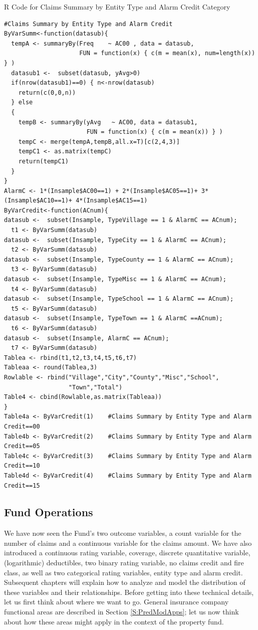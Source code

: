\documentclass[]{book}
\theoremstyle{definition}
\theoremstyle{definition}
\theoremstyle{definition}
\theoremstyle{remark}
\begin{document}
R Code for Claims Summary by Entity Type and Alarm Credit Category

\hypertarget{display.RateAlarmCredit.2}{}
\begin{verbatim}
#Claims Summary by Entity Type and Alarm Credit
ByVarSumm<-function(datasub){
  tempA <- summaryBy(Freq    ~ AC00 , data = datasub,   
                     FUN = function(x) { c(m = mean(x), num=length(x)) } )
  datasub1 <-  subset(datasub, yAvg>0)
  if(nrow(datasub1)==0) { n<-nrow(datasub)
    return(c(0,0,n))
  } else 
  {
    tempB <- summaryBy(yAvg   ~ AC00, data = datasub1,
                       FUN = function(x) { c(m = mean(x)) } )
    tempC <- merge(tempA,tempB,all.x=T)[c(2,4,3)]
    tempC1 <- as.matrix(tempC)
    return(tempC1)
  }
}
AlarmC <- 1*(Insample$AC00==1) + 2*(Insample$AC05==1)+ 3*(Insample$AC10==1)+ 4*(Insample$AC15==1)
ByVarCredit<-function(ACnum){
datasub <-  subset(Insample, TypeVillage == 1 & AlarmC == ACnum); 
  t1 <- ByVarSumm(datasub)
datasub <-  subset(Insample, TypeCity == 1 & AlarmC == ACnum);      
  t2 <- ByVarSumm(datasub)
datasub <-  subset(Insample, TypeCounty == 1 & AlarmC == ACnum);   
  t3 <- ByVarSumm(datasub)
datasub <-  subset(Insample, TypeMisc == 1 & AlarmC == ACnum);
  t4 <- ByVarSumm(datasub)
datasub <-  subset(Insample, TypeSchool == 1 & AlarmC == ACnum);    
  t5 <- ByVarSumm(datasub)
datasub <-  subset(Insample, TypeTown == 1 & AlarmC ==ACnum);      
  t6 <- ByVarSumm(datasub)
datasub <-  subset(Insample, AlarmC == ACnum);  
  t7 <- ByVarSumm(datasub)
Tablea <- rbind(t1,t2,t3,t4,t5,t6,t7)
Tableaa <- round(Tablea,3)
Rowlable <- rbind("Village","City","County","Misc","School",
                  "Town","Total")
Table4 <- cbind(Rowlable,as.matrix(Tableaa))
}
Table4a <- ByVarCredit(1)    #Claims Summary by Entity Type and Alarm Credit==00
Table4b <- ByVarCredit(2)    #Claims Summary by Entity Type and Alarm Credit==05 
Table4c <- ByVarCredit(3)    #Claims Summary by Entity Type and Alarm Credit==10
Table4d <- ByVarCredit(4)    #Claims Summary by Entity Type and Alarm Credit==15
\end{verbatim}

\subsection{Fund Operations}\label{fund-operations}

We have now seen the Fund's two outcome variables, a count variable for
the number of claims and a continuous variable for the claims amount. We
have also introduced a continuous rating variable, coverage, discrete
quantitative variable, (logarithmic) deductibles, two binary rating
variable, no claims credit and fire class, as well as two categorical
rating variables, entity type and alarm credit. Subsequent chapters will
explain how to analyze and model the distribution of these variables and
their relationships. Before getting into these technical details, let us
first think about where we want to go. General insurance company
functional areas are described in Section \ref{S:PredModApps}; let us
now think about how these areas might apply in the context of the
property fund.
\end{document}
